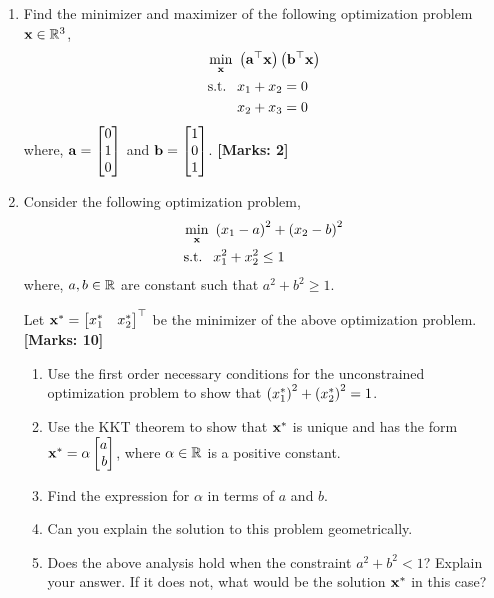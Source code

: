 \documentclass[12pt]{article}
\def\mf{\ensuremath\mathbf}
\def\mb{\ensuremath\mathbb}
\def\lp{\ensuremath\left(}
\def\rp{\ensuremath\right)}
\def\bmx{\ensuremath\begin{bmatrix*}[r]}
\def\emx{\ensuremath\end{bmatrix*}}
\newcommand{\ct}[1]{\lp #1\rp}
\begin{document}
\begin{enumerate}
    \item Find the minimizer and maximizer of the following optimization problem $\mf{x} \in \mb{R}^3$,
    \[  \begin{split}
        \min_{\mf{x}} &\,\, \ct{\mf{a}^\top \mf{x}}\ct{\mf{b}^\top \mf{x}} \\
        \text{s.t. } &\,\, x_1 + x_2 = 0\\
                    &\,\, x_2 + x_3 = 0
        \end{split} \]
    where, $\mf{a} = \bmx 0 \\ 1 \\ 0\emx$ and $\mf{b} = \bmx 1 \\ 0 \\ 1\emx$. \textbf{[Marks: 2]}
        
    \item Consider the following optimization problem,
    \[  \begin{split}
        \min_{\mf{x}} &\,\, \ct{x_1 - a}^2 + \ct{x_2 - b}^2 \\
        \text{s.t. } &\,\, x_1^2 + x_2^2 \leq 1
        \end{split} \]
    where, $a, b \in \mb{R}$ are constant such that $a^2 + b^2 \geq 1$.
    
    Let $\mf{x}^* = \bmx x_1^* & x_2^*\emx^\top$ be the minimizer of the above optimization problem.  \textbf{[Marks: 10]}
    \begin{enumerate}
        \item Use the first order necessary conditions for the unconstrained optimization problem to show that $\ct{x_1^*}^2 + \ct{x_2^*}^2 = 1$.
        \item Use the KKT theorem to show that $\mf{x}^*$ is unique and has the form $\mf{x}^* = \alpha\bmx a \\ b\emx$, where $\alpha \in \mb{R}$ is a positive constant.
        \item Find the expression for $\alpha$ in terms of $a$ and $b$.
        \item Can you explain the solution to this problem geometrically.
        \item Does the above analysis hold when the constraint $a^2 + b^2 < 1$? Explain your answer. If it does not, what would be the solution $\mf{x}^*$ in this case?
    \end{enumerate}
    

\end{enumerate}
\end{document}
